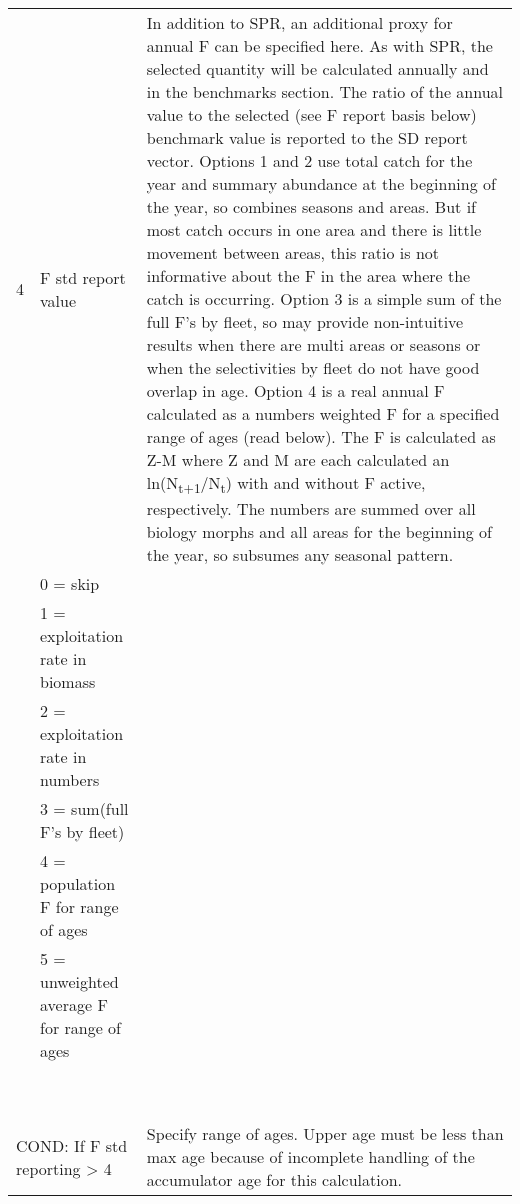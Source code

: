 \begin{landscape}
\begin{longtable}{p{1.5cm} p{7cm} p{12.5cm}}
 \pagebreak
 4 & F std report value &  \multirow{1}{1cm}[-0.1cm]{\parbox{12.5cm}{In addition to SPR, an additional proxy for annual F can be specified here.  As with SPR, the selected quantity will be calculated annually and in the benchmarks section.  The ratio of the annual value to the selected (see F report basis below) benchmark value is reported to the SD report vector.  Options 1 and 2 use total catch for the year and summary abundance at the beginning of the year, so combines seasons and areas.  But if most catch occurs in one area and there is little movement between areas, this ratio is not informative about the F in the area where the catch is occurring.  Option 3 is a simple sum of the full F’s by fleet, so may provide non-intuitive results when there are multi areas or seasons or when the selectivities by fleet do not have good overlap in age.  Option 4 is a real annual F calculated as a numbers weighted F for a specified range of ages (read below).  The F is calculated as Z-M where Z and M are each calculated an ln(N\textsubscript{t+1}/N\textsubscript{t}) with and without F active, respectively. The numbers are summed over all biology morphs and all areas for the beginning of the year, so subsumes any seasonal pattern.}}\\
   & 0 = skip & \\
   & 1 = exploitation rate in biomass & \\
   & 2 = exploitation rate in numbers & \\
   & 3 = sum(full F's by fleet) & \\
   & 4 = population F for range of ages & \\
   & 5 = unweighted average F for range of ages & \\
   & & \\
   & & \\
   & & \\
   & & \\
   & & \\
   & & \\  
   & & \\
   & & \\
   & & \\  
  
 \multicolumn{2}{l}{COND: If F std reporting > 4 } & \multirow{1}{1cm}[-0.1cm]{\parbox{12.5cm}{Specify range of ages. Upper age must be less than max age because of incomplete handling of the accumulator age for this calculation.}} \\


\end{longtable}
\end{landscape}
